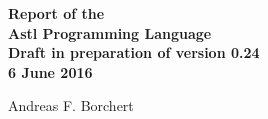 \begin{titlepage}
   \begin{flushright}
      {\Huge \bfseries
	 Report of the \\
	 Astl Programming Language \\
	 Draft in preparation of version 0.24 \\
	 6 June 2016 \\
      }

      \vspace*{\fill}

      {\huge
	 Andreas F. Borchert \\
      }
   \end{flushright}
\end{titlepage}
